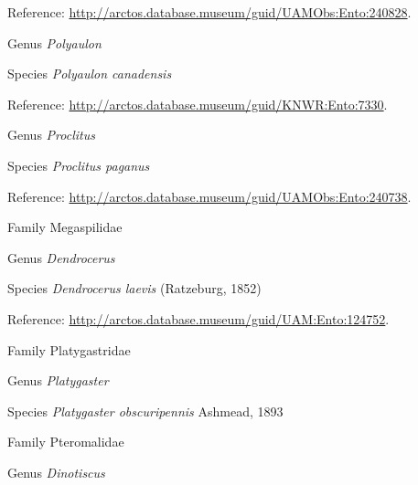 \documentclass[9pt, article]{memoir}
\begin{document}
\begin{multicols}{2}
Reference: 
\url{http://arctos.database.museum/guid/UAMObs:Ento:240828}.

\vspace{6pt}\noindent\hspace{30pt}Genus \textit{Polyaulon}


\vspace{6pt}\noindent\hspace{36pt}Species \textit{Polyaulon canadensis}


Reference: 
\url{http://arctos.database.museum/guid/KNWR:Ento:7330}.

\vspace{6pt}\noindent\hspace{30pt}Genus \textit{Proclitus}


\vspace{6pt}\noindent\hspace{36pt}Species \textit{Proclitus paganus}


Reference: 
\url{http://arctos.database.museum/guid/UAMObs:Ento:240738}.

\vspace{6pt}\noindent\hspace{24pt}Family Megaspilidae


\vspace{6pt}\noindent\hspace{30pt}Genus \textit{Dendrocerus}


\vspace{6pt}\noindent\hspace{36pt}Species \textit{Dendrocerus laevis} (Ratzeburg, 1852)


Reference: 
\url{http://arctos.database.museum/guid/UAM:Ento:124752}.

\vspace{6pt}\noindent\hspace{24pt}Family Platygastridae


\vspace{6pt}\noindent\hspace{30pt}Genus \textit{Platygaster}


\vspace{6pt}\noindent\hspace{36pt}Species \textit{Platygaster obscuripennis} Ashmead, 1893


\vspace{6pt}\noindent\hspace{24pt}Family Pteromalidae


\vspace{6pt}\noindent\hspace{30pt}Genus \textit{Dinotiscus}



\end{multicols}
\end{document}
